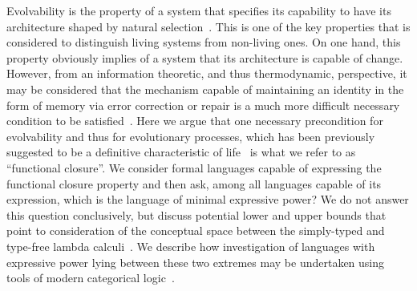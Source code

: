 Evolvability is the property of a system that specifies its capability to have its architecture shaped by natural selection~\cite{Wagner2008b}. This is one of the key properties that is considered to distinguish living systems from non-living ones. On one hand, this property obviously implies of a system that its architecture is capable of change. However, from an information theoretic, and thus thermodynamic, perspective, it may be considered that the mechanism capable of maintaining an identity in the form of memory via error correction or repair is a much more difficult necessary condition to be satisfied~\cite{Gacs2001}. Here we argue that one necessary precondition for evolvability and thus for evolutionary processes, which has been previously suggested to be a definitive characteristic of life~\cite{Rosen1972,Rosen1991,Zafiris2012,Mossio2009,Letelier2006} is what we refer to as ``functional closure''. We consider formal languages capable of expressing the functional closure property and then ask, among all languages capable of its expression, which is the language of minimal expressive power?  We do not answer this question conclusively, but discuss potential lower and upper bounds that point to consideration of the conceptual space between the simply-typed and type-free lambda calculi~\cite{Barendregt1985}. We describe how investigation of languages with expressive power lying between these two extremes may be undertaken using tools of modern categorical logic~\cite{Crole1994a,Awodey2006}.

